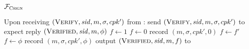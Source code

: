 \begin{systembox}{$\mathcal{F}_{\textsc{Csign}}$}
\begin{algorithmic}[1]
    \State Upon receiving $(\textsc{Verify}, \mathit{sid}, m, \sigma, cpk')$
    from \alice:
    \Indent
      \State send $(\textsc{Verify}, \mathit{sid}, m, \sigma, cpk')$ to
      \adversary
      \State expect reply $(\textsc{Verified}, \mathit{sid}, m, \phi)$
        \State $f \gets 1$
        \State $f \gets 0$
        \State record $(m, \sigma, cpk', 0)$
        \State $f \gets f'$
      \Else
        \State $f \gets \phi$
        \State record $(m, \sigma, cpk', \phi)$
      \EndIf
      \State output $(\textsc{Verified}, \mathit{sid}, m, f)$ to \alice
    \EndIndent
  \end{algorithmic}
\end{systembox}
